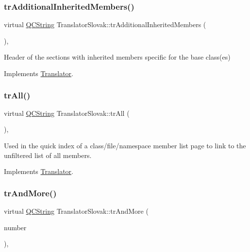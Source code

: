 \subsubsection{\texorpdfstring{trAdditionalInheritedMembers()}{trAdditionalInheritedMembers()}}
{\footnotesize\ttfamily virtual \mbox{\hyperlink{class_q_c_string}{Q\+C\+String}} Translator\+Slovak\+::tr\+Additional\+Inherited\+Members (\begin{DoxyParamCaption}{ }\end{DoxyParamCaption})\hspace{0.3cm}{\ttfamily [inline]}, {\ttfamily [virtual]}}

Header of the sections with inherited members specific for the base class(es) 

Implements \mbox{\hyperlink{class_translator}{Translator}}.

\mbox{\label{class_translator_slovak_a6225883618afc640a84970f4912994a0}} 
\subsubsection{\texorpdfstring{trAll()}{trAll()}}
{\footnotesize\ttfamily virtual \mbox{\hyperlink{class_q_c_string}{Q\+C\+String}} Translator\+Slovak\+::tr\+All (\begin{DoxyParamCaption}{ }\end{DoxyParamCaption})\hspace{0.3cm}{\ttfamily [inline]}, {\ttfamily [virtual]}}

Used in the quick index of a class/file/namespace member list page to link to the unfiltered list of all members. 

Implements \mbox{\hyperlink{class_translator}{Translator}}.

\mbox{\label{class_translator_slovak_a162e072c2765bc38b29e9986d327e6bc}} 
\subsubsection{\texorpdfstring{trAndMore()}{trAndMore()}}
{\footnotesize\ttfamily virtual \mbox{\hyperlink{class_q_c_string}{Q\+C\+String}} Translator\+Slovak\+::tr\+And\+More (\begin{DoxyParamCaption}\item[{const \mbox{\hyperlink{class_q_c_string}{Q\+C\+String}} \&}]{number }\end{DoxyParamCaption})\hspace{0.3cm}{\ttfamily [inline]}, {\ttfamily [virtual]}}

